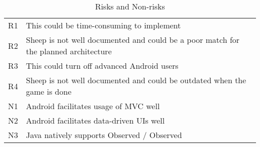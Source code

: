 \begin{table}[H]
	\begin{center}
		\begin{tabular}{| c | p{14cm} | }
    		\hline
			R1 & This could be time-consuming to implement	\\
			R2 & Sheep is not well documented and could be a poor match for the planned architecture \\
                        R3 & This could turn off advanced Android users \\
                        R4 & Sheep is not well documented and could be outdated when the game is done \\
		        N1 & Android facilitates usage of MVC well \\
			N2 & Android facilitates data-driven UIs well \\
                        N3 & Java natively supports Observed / Observed \\
                \hline
    	\end{tabular}
	\end{center}
	\label{tab:risksNonRisk}
	\caption{Risks and Non-risks}
\end{table}
